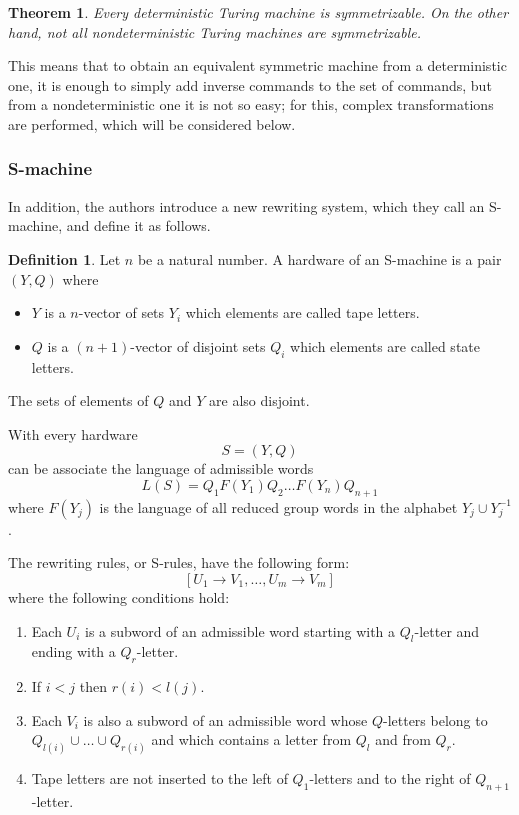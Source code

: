 \documentclass[conference]{IEEEtran}
\newtheorem{thm}{Theorem}[section]
\theoremstyle{definition}
\newtheorem{defn}{Definition}[section]
\begin{document}
\begin{thm} \label{symDetTm}
Every deterministic Turing machine is symmetrizable. On the other hand, not all nondeterministic Turing machines are symmetrizable.
\end{thm}

This means that to obtain an equivalent symmetric machine from a deterministic one, it is enough to simply add inverse commands to the set of commands, but from a nondeterministic one it is not so easy; for this, complex transformations are performed, which will be considered below.

\subsubsection{S-machine}

In addition, the authors introduce a new rewriting system, which they call an S-machine, and define it as follows.

\begin{defn}
Let $n$ be a natural number.
A hardware of an S-machine is a pair $(Y, Q)$ where
\begin{itemize}
    \item $Y$ is a $n$-vector of sets $Y_i$ which elements are called tape letters.
    \item $Q$ is a $(n + 1)$-vector of disjoint sets $Q_i$ which elements are called state letters.
\end{itemize}
The sets of elements of $Q$ and $Y$ are also disjoint.
\end{defn}

With every hardware 
$$S = (Y, Q)$$ 
can be associate the language of admissible words
$$L(S) = Q_1F(Y_1)Q_2 \dots F(Y_n)Q_{n+1}$$
where $F(Y_j)$ is the language
of all reduced group words in the alphabet $Y_j \cup Y_j^{-1}$.

The rewriting rules, or S-rules, have the following form:
$$[U_1 \to V_1, \dots ,  U_m \to V_m]$$
where the following conditions hold:
\begin{enumerate}
    \item Each $U_i$ is a subword of an admissible word starting with a $Q_l$-letter and ending with a $Q_r$-letter.
    \item If $i < j$ then $r(i) < l(j)$.
    \item Each $V_i$ is also a subword of an admissible word whose $Q$-letters belong to $Q_{l(i)} \cup \dots \cup Q_{r(i)}$ and which contains a letter from $Q_l$ and from $Q_r$.
    \item Tape letters are not inserted to the left of $Q_1$-letters and to the right of $Q_{n+1}$-letter.
\end{enumerate}
\end{document}
